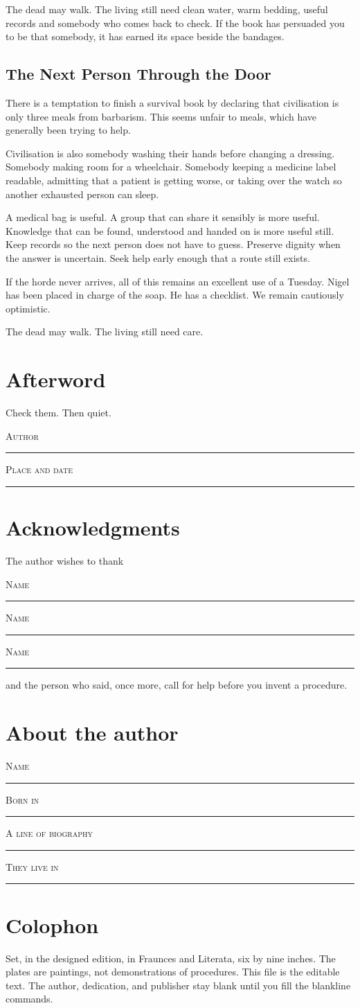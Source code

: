 \documentclass[10pt,openright]{book}
\newcommand{\blankline}[1]{%
  \par\medskip
  {\small\scshape #1}\par\noindent
  \rule{0.8\textwidth}{0.4pt}\par\smallskip
}
\begin{document}
The dead may walk. The living still need clean water, warm bedding, useful records and somebody who comes back to check. If the book has persuaded you to be that somebody, it has earned its space beside the bandages.

\section*{The Next Person Through the Door}
There is a temptation to finish a survival book by declaring that civilisation is only three meals from barbarism. This seems unfair to meals, which have generally been trying to help.

Civilisation is also somebody washing their hands before changing a dressing. Somebody making room for a wheelchair. Somebody keeping a medicine label readable, admitting that a patient is getting worse, or taking over the watch so another exhausted person can sleep.

A medical bag is useful. A group that can share it sensibly is more useful. Knowledge that can be found, understood and handed on is more useful still. Keep records so the next person does not have to guess. Preserve dignity when the answer is uncertain. Seek help early enough that a route still exists.

If the horde never arrives, all of this remains an excellent use of a Tuesday. Nigel has been placed in charge of the soap. He has a checklist. We remain cautiously optimistic.

The dead may walk. The living still need care.

\backmatter
\chapter*{Afterword}
Check them. Then quiet.
\blankline{Author}
\blankline{Place and date}
\chapter*{Acknowledgments}
The author wishes to thank
\blankline{Name}
\blankline{Name}
\blankline{Name}
and the person who said, once more, call for help before you invent a procedure.
\chapter*{About the author}
\blankline{Name}
\blankline{Born in}
\blankline{A line of biography}
\blankline{They live in}
\chapter*{Colophon}
Set, in the designed edition, in Fraunces and Literata, six by nine inches.
The plates are paintings, not demonstrations of procedures.
This file is the editable text. The author, dedication, and publisher stay blank until you fill the blankline commands.
\end{document}
